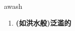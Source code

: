
\begin{frame}
{\huge awash}
\begin{center}
\begin{enumerate}\Large
  \item \textbf{(如洪水般)泛滥的}
\end{enumerate}
\end{center}
\end{frame}
